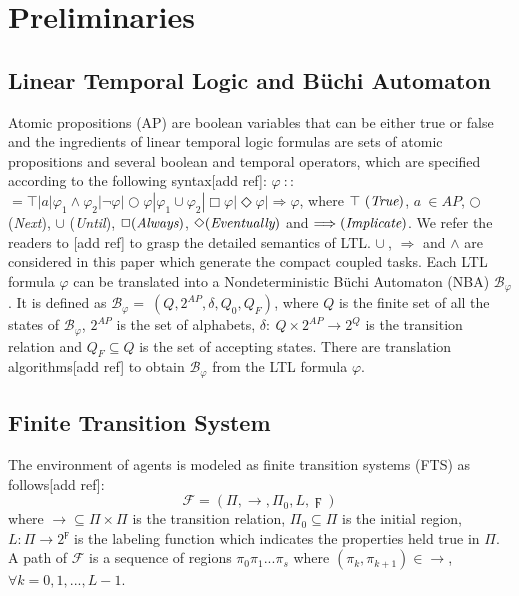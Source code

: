 \documentclass[journal]{IEEEtran}
\begin{document}
\section{Preliminaries}
\subsection{Linear Temporal Logic and B\"{u}chi Automaton}
Atomic propositions (AP) are boolean variables that can be either true or false and the ingredients of linear temporal logic formulas are sets of atomic propositions and several boolean and temporal operators, which are specified according to the following syntax[add ref]: $\varphi\ $$:$$:$$=\top|a|\varphi_1\wedge\varphi_2| \neg \varphi|\bigcirc\varphi|\varphi_1\cup\varphi_2|\Box\varphi|\Diamond\varphi|\Longrightarrow\varphi$, where $\top\ (\emph{True})$, $a\ \in AP$, $\bigcirc$ (\emph{Next}), $\cup$ (\emph{Until}), $\Box (\emph{Always})$,  $\Diamond (\emph{Eventually})$ and $\Longrightarrow (\emph{Implicate})$. We refer the readers to [add ref] to grasp the detailed semantics of LTL. $\cup\ $, $\Longrightarrow$ and $\wedge$ are considered in this paper which generate the compact coupled tasks.
Each LTL formula $\varphi$ can be translated into a Nondeterministic B\"{u}chi Automaton (NBA) $\mathcal{B}_\varphi$. It is defined as $\mathcal{B}_\varphi=\ (Q,2^{AP},\delta,Q_0,Q_F)$, where $Q$ is the finite set of all the states of $\mathcal{B}_\varphi$, $2^{AP}$ is the set of alphabets, $\delta:\ Q\times 2^{AP}\rightarrow 2^Q$ is the transition relation and $Q_F \subseteq Q$ is the set of accepting states. There are translation algorithms[add ref] to obtain $\mathcal{B}_\varphi$ from the LTL formula $\varphi$.
\subsection{Finite Transition System}
The environment of agents is modeled as finite transition systems (FTS) as follows[add ref]:
$$\mathcal{F}=(\Pi,\rightarrow,\Pi_0,L,\digamma)$$
where $\rightarrow \subseteq \Pi \times \Pi$ is the transition relation, $\Pi_0 \subseteq \Pi$ is the initial region, $L:\Pi\rightarrow 2^{\digamma}$ is the labeling function which indicates the properties held true in $\Pi$. A path of $\mathcal{F}$ is a sequence of regions $\pi_0 \pi_1 ...\pi_s$ where $(\pi_k,\pi_{k+1})\in \rightarrow$, $\forall k=0,1,...,L-1$.
\end{document}
